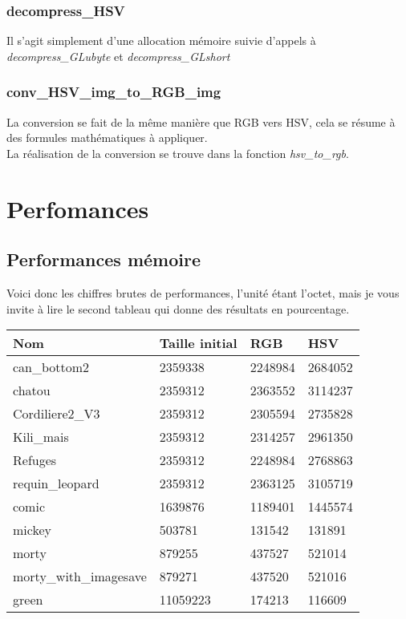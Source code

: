 \documentclass[12pt, letterpaper]{article}
\begin{document}
\subsubsection{decompress\_HSV}
Il s'agit simplement d'une allocation mémoire suivie d'appels à \\\textit{decompress\_GLubyte} et \textit{decompress\_GLshort}

\subsubsection{conv\_HSV\_img\_to\_RGB\_img}
La conversion se fait de la même manière que RGB vers HSV, cela se résume à des formules mathématiques à appliquer.\\
La réalisation de la conversion se trouve dans la fonction \textit{hsv\_to\_rgb}.

\section{Perfomances}

\subsection{Performances mémoire}
Voici donc les chiffres brutes de performances, l'unité étant l'octet, mais je vous invite à lire le second 
tableau qui donne des résultats en pourcentage.

\begin{tabular}{l|l|l|l}
  Nom  & Taille initial & RGB & HSV\\
  \hline  
  can\_bottom2 & 2359338 & 2248984 & 2684052\\
  \hline
  chatou & 2359312 & 2363552 & 3114237\\
  \hline
  Cordiliere2\_V3 & 2359312 & 2305594 & 2735828\\
  \hline
  Kili\_mais & 2359312 & 2314257 & 2961350\\
  \hline
  Refuges & 2359312 & 2248984 & 2768863\\
  \hline
  requin\_leopard & 2359312 & 2363125 & 3105719\\
  \hline
  comic & 1639876 & 1189401 & 1445574 \\
  \hline
  mickey & 503781 & 131542 & 131891\\
  \hline
  morty & 879255 & 437527 & 521014\\
  \hline
  morty\_with\_imagesave & 879271 & 437520 & 521016 \\
  \hline
  green & 11059223 & 174213 & 116609 \\
\end{tabular}
\end{document}
